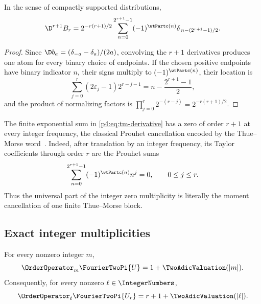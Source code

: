 \documentclass[11pt]{article}
\numberwithin{equation}{section}
\theoremstyle{definition}
\theoremstyle{remark}
\begin{document}
\begin{proposition}
\label{p4:prop:tm-derivative}
In the sense of compactly supported distributions,
\begin{equation}
 \D^{r+1}B_r
 =2^{-r(r+1)/2}
 \sum_{n=0}^{2^{r+1}-1}
 (-1)^{\wtPartc(n)}
 \delta_{\,n-(2^{r+1}-1)/2}.
 \label{p4:eq:tm-derivative}
\end{equation}
\end{proposition}

\begin{proof}
Since
$\D b_a=(\delta_{-a}-\delta_a)/(2a)$, convolving the $r+1$ derivatives produces one atom for every binary choice of endpoints.  If the chosen positive endpoints have binary indicator $n$, their signs multiply to $(-1)^{\wtPartc(n)}$, their location is
\[
 \sum_{j=0}^{r}(2\varepsilon_j-1)2^{r-j-1}
 =n-\frac{2^{r+1}-1}{2},
\]
and the product of normalizing factors is
$\prod_{j=0}^{r}2^{-(r-j)}=2^{-r(r+1)/2}$.
\end{proof}

The finite exponential sum in \eqref{p4:eq:tm-derivative} has a zero of order $r+1$ at every integer frequency, the classical Prouhet cancellation encoded by the Thue--Morse word~\cite{p4:prouhet,p4:alloucheShallit}.  Indeed, after translation by an integer frequency, its Taylor coefficients through order $r$ are the Prouhet sums
\begin{equation}
 \sum_{n=0}^{2^{r+1}-1}(-1)^{\wtPartc(n)}n^j=0,
 \qquad 0\le j\le r.
 \label{p4:eq:prouhet}
\end{equation}
Thus the universal part of the integer zero multiplicity is literally the moment cancellation of one finite Thue--Morse block.

\subsection{Exact integer multiplicities}
\begin{proposition}
\label{p4:prop:zero-multiplicity}
For every nonzero integer $m$,
\begin{equation}
 \OrderOperator_m\FourierTwoPi{U}=1+\TwoAdicValuation(|m|).
 \label{p4:eq:zero-multiplicity}
\end{equation}
Consequently, for every nonzero $\ell\in\IntegerNumbers$,
\begin{equation}
 \OrderOperator_\ell\FourierTwoPi{U_r}=r+1+\TwoAdicValuation(|\ell|).
 \label{p4:eq:scaled-zero-multiplicity}
\end{equation}
\end{proposition}
\end{document}
